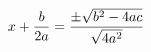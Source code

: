 \documentclass[preview]{standalone}
\begin{document}
\begin{align*}
x + { b \over 2 a } = { \pm \sqrt { b ^2 - 4 a c } \over \sqrt { 4 a ^2 } }
\end{align*}
\end{document}
